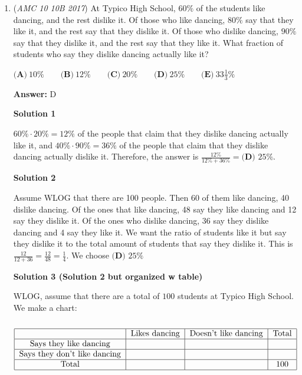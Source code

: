 \begin{enumerate}
 


	\item (\textit{AMC 10 10B 2017}) At Typico High School, $60\%$ of the students like dancing, and the rest dislike it. Of those who like dancing, $80\%$ say that they like it, and the rest say that they dislike it. Of those who dislike dancing, $90\%$ say that they dislike it, and the rest say that they like it. What fraction of students who say they dislike dancing actually like it?


 $\textbf{(A)}\ 10\%\qquad\textbf{(B)}\ 12\%\qquad\textbf{(C)}\ 20\%\qquad\textbf{(D)}\ 25\%\qquad\textbf{(E)}\ 33\frac{1}{3}\%$

 \textbf{Answer: }D



\textbf{Solution 1}

$60\% \cdot 20\% = 12\%$ of the people that claim that they dislike dancing actually like it, and $40\% \cdot 90\% = 36\%$ of the people that claim that they dislike dancing actually dislike it. Therefore, the answer is $\frac{12\%}{12\%+36\%} = \boxed{\textbf{(D) } 25\%}$.

 



\textbf{Solution 2}

Assume WLOG that there are 100 people. Then 60 of them like dancing, 40 dislike dancing. Of the ones that like dancing, 48 say they like dancing and 12 say they dislike it. Of the ones who dislike dancing, 36 say they dislike dancing and 4 say they like it. We want the ratio of students like it but say they dislike it to the total amount of students that say they dislike it. This is $\frac{12}{12+36}=\frac{12}{48}=\frac{1}{4}$. We choose $\boxed{\textbf{(D) } 25\%}$




\textbf{Solution 3 (Solution 2 but organized w table)}

WLOG, assume that there are a total of $100$ students at Typico High School. We make a chart: 

 
 \[\begin{tabular}[t]{|c|c|c|c|}\hline & \text{Likes dancing} & \text{Doesn't like dancing} & \text{Total} \\\hline \text{Says they like dancing} & & & \\\hline \text{Says they don't like dancing} & & & \\\hline \text{Total} & & & 100 \\\hline \end{tabular}\]


\end{enumerate}
